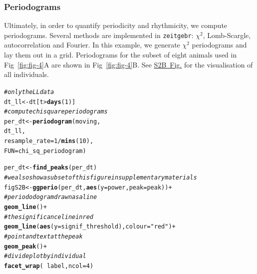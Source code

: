 \documentclass[10pt,letterpaper]{article}\usepackage[]{graphicx}\usepackage[]{color}
\makeatletter
\newcommand{\hlnum}[1]{\textcolor[rgb]{0.686,0.059,0.569}{#1}}%
\newcommand{\hlstr}[1]{\textcolor[rgb]{0.192,0.494,0.8}{#1}}%
\newcommand{\hlcom}[1]{\textcolor[rgb]{0.678,0.584,0.686}{\textit{#1}}}%
\newcommand{\hlopt}[1]{\textcolor[rgb]{0,0,0}{#1}}%
\newcommand{\hlstd}[1]{\textcolor[rgb]{0.345,0.345,0.345}{#1}}%
\newcommand{\hlkwb}[1]{\textcolor[rgb]{0.69,0.353,0.396}{#1}}%
\newcommand{\hlkwc}[1]{\textcolor[rgb]{0.333,0.667,0.333}{#1}}%
\newcommand{\hlkwd}[1]{\textcolor[rgb]{0.737,0.353,0.396}{\textbf{#1}}}%
\newenvironment{kframe}{%
 \def\at@end@of@kframe{}%
 \ifinner\ifhmode%
  \def\at@end@of@kframe{\end{minipage}}%
  \begin{minipage}{\columnwidth}%
 \fi\fi%
 \def\FrameCommand##1{\hskip\@totalleftmargin \hskip-\fboxsep
 \colorbox{shadecolor}{##1}\hskip-\fboxsep
     \hskip-\linewidth \hskip-\@totalleftmargin \hskip\columnwidth}%
 \MakeFramed {\advance\hsize-\width
   \@totalleftmargin\z@ \linewidth\hsize
   \@setminipage}}%
 {\par\unskip\endMakeFramed%
 \at@end@of@kframe}
\newenvironment{knitrout}{}{} %
\makeatother
\begin{document}
\subsubsection*{Periodograms}
Ultimately, in order to quantify periodicity and rhythmicity, we compute periodograms.
Several methods are implemented in \texttt{zeitgebr}: $\chi{}^2$, Lomb-Scargle, autocorrelation 
and Fourier.
In this example, we generate $\chi{}^2$ periodograms and lay them out in a grid.
Periodograms for the subset of eight animals used in Fig~\ref{fig:fig-4}A are shown in Fig~\ref{fig:fig-4}B. 
See \hyperref[S2-Fig]{S2B~Fig.} for the visualisation of all individuals.

\begin{knitrout}
\color{fgcolor}\begin{kframe}
\begin{alltt}
\hlcom{# only the LL data}
\hlstd{dt_ll} \hlkwb{<-} \hlstd{dt[t} \hlopt{>} \hlkwd{days}\hlstd{(}\hlnum{1}\hlstd{)]}
\hlcom{# compute chi square periodograms }
\hlstd{per_dt} \hlkwb{<-} \hlkwd{periodogram}\hlstd{(moving,}
                        \hlstd{dt_ll,}
                        \hlkwc{resample_rate} \hlstd{=} \hlnum{1} \hlopt{/} \hlkwd{mins}\hlstd{(}\hlnum{10}\hlstd{),}
                        \hlkwc{FUN}\hlstd{=chi_sq_periodogram)}

\hlstd{per_dt} \hlkwb{<-} \hlkwd{find_peaks}\hlstd{(per_dt)}
\hlcom{# we also show a subset of this figure in supplementary materials}
\hlstd{figS2B} \hlkwb{<-} \hlkwd{ggperio}\hlstd{(per_dt,} \hlkwd{aes}\hlstd{(}\hlkwc{y} \hlstd{= power,} \hlkwc{peak} \hlstd{= peak))} \hlopt{+}
                  \hlcom{# periododogram drawn as a line}
                  \hlkwd{geom_line}\hlstd{()} \hlopt{+}
                  \hlcom{# the significance line in red}
                  \hlkwd{geom_line}\hlstd{(}\hlkwd{aes}\hlstd{(}\hlkwc{y} \hlstd{= signif_threshold),} \hlkwc{colour} \hlstd{=} \hlstr{"red"}\hlstd{)} \hlopt{+}
                  \hlcom{# point and text at the peak}
                  \hlkwd{geom_peak}\hlstd{()} \hlopt{+}
                  \hlcom{# divide plot by individual}
                  \hlkwd{facet_wrap}\hlstd{(} \hlopt{~} \hlstd{label,} \hlkwc{ncol} \hlstd{=} \hlnum{4}\hlstd{)}
\end{alltt}
\end{kframe}
\end{knitrout}
\end{document}
